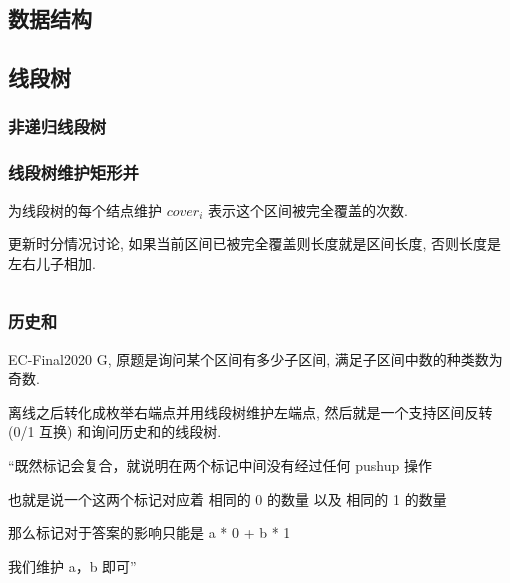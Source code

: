 \documentclass[a4paper, twoside]{article}
\begin{document}
\begin{multicols}{2}


			
		\newpage
		\section{数据结构}

			\subsection{线段树}
				\subsubsection{非递归线段树}
					
				
				\subsubsection{线段树维护矩形并}
					为线段树的每个结点维护 $cover_i$ 表示这个区间被完全覆盖的次数.

					更新时分情况讨论, 如果当前区间已被完全覆盖则长度就是区间长度, 否则长度是左右儿子相加.
					\inputminted{cpp}{../src/datastructure/线段树维护矩形并.cpp}
				
				\subsubsection{历史和}

					EC-Final2020 G, 原题是询问某个区间有多少子区间, 满足子区间中数的种类数为奇数.

					离线之后转化成枚举右端点并用线段树维护左端点, 然后就是一个支持区间反转 (0/1 互换) 和询问历史和的线段树.

					``既然标记会复合，就说明在两个标记中间没有经过任何 pushup 操作

					也就是说一个这两个标记对应着 相同的 0 的数量 以及 相同的 1 的数量

					那么标记对于答案的影响只能是 a * 0 + b * 1

					我们维护 a，b 即可''

					\inputminted{cpp}{../src/datastructure/ec20g.cpp}


\end{multicols}
\end{document}
